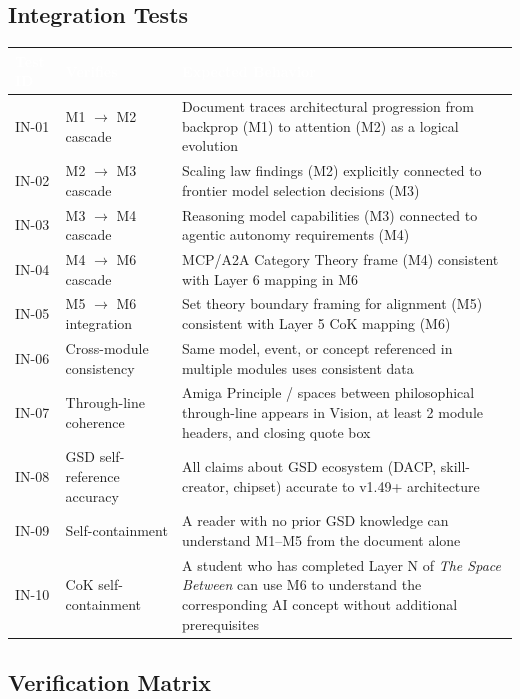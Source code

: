 \documentclass[11pt,letterpaper]{article}
\newcommand{\tableheader}[1]{\textbf{\sffamily\textcolor{white}{#1}}}
\begin{document}
\subsection{Integration Tests}

\begin{center}
\begin{tabularx}{\textwidth}{C{1.5cm}L{3.5cm}X}
\toprule
{}
\tableheader{Test ID} & \tableheader{Verifies} & \tableheader{Expected Behavior} \\
\midrule
IN-01 & M1 $\to$ M2 cascade & Document traces architectural progression from backprop (M1) to attention (M2) as a logical evolution \\
IN-02 & M2 $\to$ M3 cascade & Scaling law findings (M2) explicitly connected to frontier model selection decisions (M3) \\
IN-03 & M3 $\to$ M4 cascade & Reasoning model capabilities (M3) connected to agentic autonomy requirements (M4) \\
IN-04 & M4 $\to$ M6 cascade & MCP/A2A Category Theory frame (M4) consistent with Layer 6 mapping in M6 \\
IN-05 & M5 $\to$ M6 integration & Set theory boundary framing for alignment (M5) consistent with Layer 5 CoK mapping (M6) \\
IN-06 & Cross-module consistency & Same model, event, or concept referenced in multiple modules uses consistent data \\
IN-07 & Through-line coherence & Amiga Principle / spaces between philosophical through-line appears in Vision, at least 2 module headers, and closing quote box \\
IN-08 & GSD self-reference accuracy & All claims about GSD ecosystem (DACP, skill-creator, chipset) accurate to v1.49+ architecture \\
IN-09 & Self-containment & A reader with no prior GSD knowledge can understand M1--M5 from the document alone \\
IN-10 & CoK self-containment & A student who has completed Layer N of \textit{The Space Between} can use M6 to understand the corresponding AI concept without additional prerequisites \\
\bottomrule
\end{tabularx}
\end{center}

\subsection{Verification Matrix}
\end{document}
